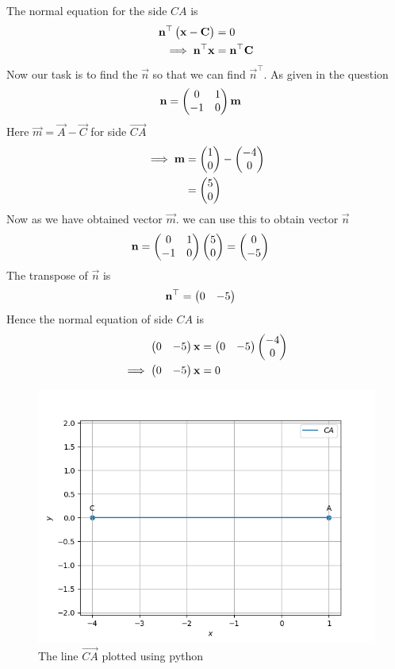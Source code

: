 \documentclass[11pt]{book}
\begin{document}
\begin{enumerate}[label=\thesection.\arabic*.,ref=\thesection.\theenumi]
       The normal equation for the side $CA$ is
\begin{align}
\mathbf{n}^{\top}\begin{pmatrix}\mathbf{x}-\mathbf{C}\end{pmatrix}&=0\\
\implies
\mathbf{n}^{\top}\mathbf{x}&=\mathbf{n}^{\top}\mathbf{C}
\end{align}
Now our task is to find the $\vec{n}$ so that we can find $\vec{n}^{\top}$.
As given in the question 
\begin{align}
  \mathbf{n} &= \begin{pmatrix}0 & 1\\
  -1 & 0\end{pmatrix}\mathbf{m}
\end{align}
Here $\vec{m} = \vec{A}- \vec{C}$ for side $\vec{CA}$
\begin{align}
\implies
\mathbf{m}&=\begin{pmatrix}1\\0\end{pmatrix} - \begin{pmatrix}-4\\0\end{pmatrix}\\
&=\begin{pmatrix}5\\0\end{pmatrix}
\end{align}
Now as we have obtained vector $\vec{m}$.
we can use this to obtain vector $\vec{n}$
\begin{align}
\mathbf{n} &= \begin{pmatrix}0 & 1\\
  -1 & 0\end{pmatrix}\begin{pmatrix}5\\0\end{pmatrix}
 = \begin{pmatrix}0\\-5\end{pmatrix}
\end{align}
The transpose of $\vec{n}$ is
\begin{align}
  \mathbf{n}^{\top}&=\begin{pmatrix}0 & -5\end{pmatrix}
\end{align}
Hence the normal equation of side $CA$ is 
\begin{align}
    \begin{pmatrix}0 & -5\end{pmatrix}\mathbf{x}&=\begin{pmatrix}0 & -5\end{pmatrix}\begin{pmatrix}-4\\0\end{pmatrix}\\
    \implies
    \begin{pmatrix}0 & -5\end{pmatrix}\mathbf{x}&=0
\end{align}
\begin{figure}
\includegraphics [width=\columnwidth] {figs/CAline.png}
\caption{ The line $\vec{CA}$ plotted using python}
\label{fig: lineca}
\end{figure}



\end{enumerate}
\end{document}
